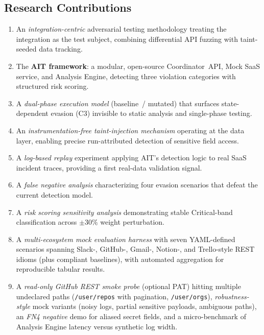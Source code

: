 \documentclass[conference]{IEEEtran}
\begin{document}
\subsection{Research Contributions}

\begin{enumerate}
  \item An \emph{integration-centric} adversarial testing methodology
        treating the integration as the test subject, combining
        differential API fuzzing with taint-seeded data tracking.
  \item The \textbf{AIT framework}: a modular, open-source
        Coordinator~API, Mock SaaS service, and Analysis Engine,
        detecting three violation categories with structured risk
        scoring.
  \item A \emph{dual-phase execution model} (baseline~/ mutated) that
        surfaces state-dependent evasion (C3) invisible to static
        analysis and single-phase testing.
  \item An \emph{instrumentation-free taint-injection mechanism}
        operating at the data layer, enabling precise run-attributed
        detection of sensitive field access.
  \item A \emph{log-based replay} experiment applying AIT's detection
        logic to real SaaS incident traces, providing a first
        real-data validation signal.
  \item A \emph{false negative analysis} characterizing four evasion
        scenarios that defeat the current detection model.
  \item A \emph{risk scoring sensitivity analysis} demonstrating
        stable Critical-band classification across $\pm30\%$ weight
        perturbation.
  \item A \emph{multi-ecosystem mock evaluation harness} with seven
        YAML-defined scenarios spanning Slack-, GitHub-, Gmail-, Notion-,
        and Trello-style REST idioms (plus compliant baselines), with
        automated aggregation for reproducible tabular results.
  \item A \emph{read-only GitHub REST smoke probe} (optional PAT) hitting
        multiple undeclared paths (\texttt{/user/repos} with pagination,
        \texttt{/user/orgs}), \emph{robustness-style} mock variants (noisy logs,
        partial sensitive payloads, ambiguous paths), an \emph{FN4 negative}
        demo for aliased secret fields, and a micro-benchmark of Analysis
        Engine latency versus synthetic log width.
\end{enumerate}
\end{document}
